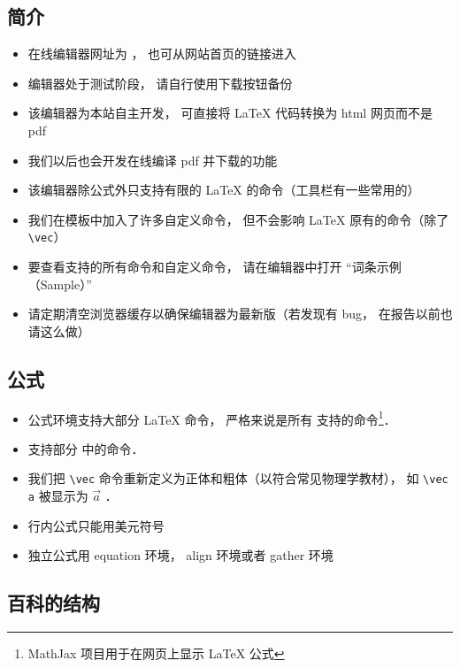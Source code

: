 
\subsection{简介}
\begin{itemize}
\item 在线编辑器网址为 ， 也可从网站首页的链接进入
\item 编辑器处于测试阶段， 请自行使用下载按钮备份
\item 该编辑器为本站自主开发， 可直接将 LaTeX 代码转换为 html 网页而不是 pdf
\item 我们以后也会开发在线编译 pdf 并下载的功能
\item 该编辑器除公式外只支持有限的 LaTeX 的命令（工具栏有一些常用的）
\item 我们在模板中加入了许多自定义命令， 但不会影响 LaTeX 原有的命令（除了 \lstinline|\vec|）
\item 要查看支持的所有命令和自定义命令， 请在编辑器中打开 “词条示例（Sample）”
\item 请定期清空浏览器缓存以确保编辑器为最新版（若发现有 bug， 在报告以前也请这么做）
\end{itemize}

\subsection{公式}
\begin{itemize}
\item 公式环境支持大部分 LaTeX 命令， 严格来说是所有  支持的命令\footnote{MathJax 项目用于在网页上显示 LaTeX 公式}．
\item 支持部分 中的命令．
\item 我们把 \lstinline|\vec| 命令重新定义为正体和粗体（以符合常见物理学教材）， 如 \lstinline|\vec a| 被显示为 $\vec a$ ．
\item 行内公式只能用美元符号
\item 独立公式用 equation 环境， align 环境或者 gather 环境
\end{itemize}

\subsection{百科的结构}

